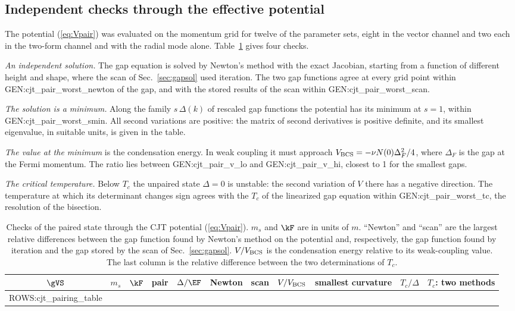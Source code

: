 \subsection{Independent checks through the effective potential}
\label{sec:checks}

The potential (\ref{eq:Vpair}) was evaluated on the momentum grid for twelve of the parameter sets,
eight in the vector channel and two each in the two-form channel and with the radial mode alone.
Table~\ref{tab:cjtchecks} gives four checks.

\emph{An independent solution.} The gap equation is solved by Newton's method with the exact
Jacobian, starting from a function of different height and shape, where the scan of
Sec.~\ref{sec:gapsol} used iteration. The two gap functions agree at every grid point within
{{GEN:cjt_pair_worst_newton}} of the gap, and with the stored results of the scan within
{{GEN:cjt_pair_worst_scan}}.

\emph{The solution is a minimum.} Along the family $s\,\Delta(k)$ of rescaled gap functions the
potential has its minimum at $s=1$, within {{GEN:cjt_pair_worst_smin}}. All second variations are
positive: the matrix of second derivatives is positive definite, and its smallest eigenvalue, in
suitable units, is given in the table.

\emph{The value at the minimum} is the condensation energy. In weak coupling it must approach
$V_{\rm BCS}=-\nu N(0)\Delta_F^2/4$, where $\Delta_F$ is the gap at the Fermi momentum. The ratio lies
between {{GEN:cjt_pair_v_lo}} and {{GEN:cjt_pair_v_hi}}, closest to 1 for the smallest gaps.

\emph{The critical temperature.} Below $T_c$ the unpaired state $\Delta=0$ is unstable: the second
variation of $V$ there has a negative direction. The temperature at which its determinant changes
sign agrees with the $T_c$ of the linearized gap equation within {{GEN:cjt_pair_worst_tc}}, the
resolution of the bisection.

\begin{table}
\caption{\label{tab:cjtchecks}Checks of the paired state through the CJT potential (\ref{eq:Vpair}).
$m_s$ and $\kF$ are in units of $m$. ``Newton'' and ``scan'' are the largest relative differences
between the gap function found by Newton's method on the potential and, respectively, the gap function
found by iteration and the gap stored by the scan of Sec.~\ref{sec:gapsol}. $V/V_{\rm BCS}$ is the
condensation energy relative to its weak-coupling value. The last column is the relative difference
between the two determinations of $T_c$.}
\begin{ruledtabular}
\begin{tabular}{ccclccccccc}
$\gVS$ & $m_s$ & $\kF$ & pair & $\Delta/\EF$ & Newton & scan & $V/V_{\rm BCS}$ & smallest curvature & $T_c/\Delta$ & $T_c$: two methods \\
\hline
{{ROWS:cjt_pairing_table}}
\end{tabular}
\end{ruledtabular}
\end{table}


